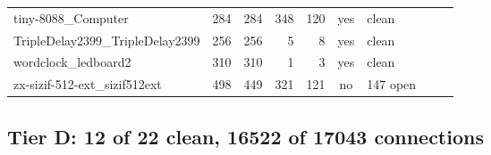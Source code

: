 \begin{longtable}{@{}p{0.36\linewidth}rrrrcp{0.22\linewidth}@{}}
tiny-\allowbreak{}8088\_\allowbreak{}Computer & 284 & 284 & 348 & 120 & \textcolor{fraqua}{yes} & {\footnotesize clean} \\
TripleDelay2399\_\allowbreak{}TripleDelay2399 & 256 & 256 & 5 & 8 & \textcolor{fraqua}{yes} & {\footnotesize clean} \\
wordclock\_\allowbreak{}ledboard2 & 310 & 310 & 1 & 3 & \textcolor{fraqua}{yes} & {\footnotesize clean} \\
zx-\allowbreak{}sizif-\allowbreak{}512-\allowbreak{}ext\_\allowbreak{}sizif512ext & 498 & 449 & 321 & 121 & \textcolor{frorange}{no} & {\footnotesize 147 open} \\
\bottomrule\end{longtable}
\subsection*{Tier D: 12 of 22 clean, 16522 of 17043 connections}
